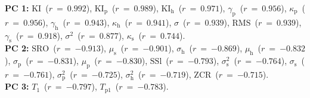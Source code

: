 {\bf{PC 1:}} $\mathrm{KI}$~($r~=~{0.992}$), $\mathrm{KI_{p}}$~($r~=~{0.989}$), $\mathrm{KI_{h}}$~($r~=~{0.971}$), $\gamma_{\mathrm{p}}$~($r~=~{0.956}$), $\kappa_{\mathrm{p}}$~($r~=~{0.956}$), $\gamma_{\mathrm{h}}$~($r~=~{0.943}$), $\kappa_{\mathrm{h}}$~($r~=~{0.941}$), $\sigma$~($r~=~{0.939}$), $\mathrm{RMS}$~($r~=~{0.939}$), $\gamma_{\mathrm{s}}$~($r~=~{0.918}$), $\sigma^{2}$~($r~=~{0.877}$), $\kappa_{\mathrm{s}}$~($r~=~{0.744}$).\vspace{0.5em}\\
{\bf{PC 2:}} $\mathrm{SRO}$~($r~=~{-0.913}$), $\mu_{\mathrm{s}}$~($r~=~{-0.901}$), $\sigma_{\mathrm{h}}$~($r~=~{-0.869}$), $\mu_{\mathrm{h}}$~($r~=~{-0.832}$), $\sigma_{\mathrm{p}}$~($r~=~{-0.831}$), $\mu_{\mathrm{p}}$~($r~=~{-0.830}$), $\mathrm{SSl}$~($r~=~{-0.793}$), $\sigma_{\mathrm{s}}^{2}$~($r~=~{-0.764}$), $\sigma_{\mathrm{s}}$~($r~=~{-0.761}$), $\sigma_{\mathrm{p}}^{2}$~($r~=~{-0.725}$), $\sigma_{\mathrm{h}}^{2}$~($r~=~{-0.719}$), $\mathrm{ZCR}$~($r~=~{-0.715}$).\vspace{0.5em}\\
{\bf{PC 3:}} $T_{1}$~($r~=~{-0.797}$), $T_{\mathrm{p}1}$~($r~=~{-0.783}$).
